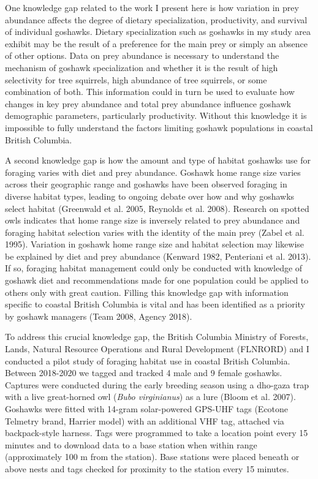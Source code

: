 \documentclass{sfuthesis}
\begin{document}
One knowledge gap related to the work I present here is how variation in prey abundance affects the degree of dietary specialization, productivity, and survival of individual goshawks. Dietary specialization such as goshawks in my study area exhibit may be the result of a preference for the main prey or simply an absence of other options. Data on prey abundance is necessary to understand the mechanism of goshawk specialization and whether it is the result of high selectivity for tree squirrels, high abundance of tree squirrels, or some combination of both. This information could in turn be used to evaluate how changes in key prey abundance and total prey abundance influence goshawk demographic parameters, particularly productivity. Without this knowledge it is impossible to fully understand the factors limiting goshawk populations in coastal British Columbia.

A second knowledge gap is how the amount and type of habitat goshawks use for foraging varies with diet and prey abundance. Goshawk home range size varies across their geographic range and goshawks have been observed foraging in diverse habitat types, leading to ongoing debate over how and why goshawks select habitat (Greenwald et al. 2005, Reynolds et al. 2008). Research on spotted owls indicates that home range size is inversely related to prey abundance and foraging habitat selection varies with the identity of the main prey (Zabel et al. 1995). Variation in goshawk home range size and habitat selection may likewise be explained by diet and prey abundance (Kenward 1982, Penteriani et al. 2013). If so, foraging habitat management could only be conducted with knowledge of goshawk diet and recommendations made for one population could be applied to others only with great caution. Filling this knowledge gap with information specific to coastal British Columbia is vital and has been identified as a priority by goshawk managers (Team 2008, Agency 2018).

To address this crucial knowledge gap, the British Columbia Ministry of Forests, Lands, Natural Resource Operations and Rural Development (FLNRORD) and I conducted a pilot study of foraging habitat use in coastal British Columbia. Between 2018-2020 we tagged and tracked 4 male and 9 female goshawks. Captures were conducted during the early breeding season using a dho-gaza trap with a live great-horned owl (\emph{Bubo virginianus}) as a lure (Bloom et al. 2007). Goshawks were fitted with 14-gram solar-powered GPS-UHF tags (Ecotone Telmetry brand, Harrier model) with an additional VHF tag, attached via backpack-style harness. Tags were programmed to take a location point every 15 minutes and to download data to a base station when within range (approximately 100 m from the station). Base stations were placed beneath or above nests and tags checked for proximity to the station every 15 minutes.
\end{document}
